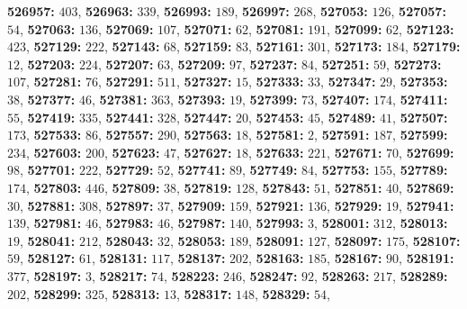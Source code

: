 \textsf{\bfseries 526957:} $403$, \textsf{\bfseries 526963:} $339$, \textsf{\bfseries 526993:} $189$, \textsf{\bfseries 526997:} $268$, \textsf{\bfseries 527053:} $126$, \textsf{\bfseries 527057:} $54$, \textsf{\bfseries 527063:} $136$, \textsf{\bfseries 527069:} $107$, \textsf{\bfseries 527071:} $62$, \textsf{\bfseries 527081:} $191$, \textsf{\bfseries 527099:} $62$, \textsf{\bfseries 527123:} $423$, \textsf{\bfseries 527129:} $222$, \textsf{\bfseries 527143:} $68$, \textsf{\bfseries 527159:} $83$, \textsf{\bfseries 527161:} $301$, \textsf{\bfseries 527173:} $184$, \textsf{\bfseries 527179:} $12$, \textsf{\bfseries 527203:} $224$, \textsf{\bfseries 527207:} $63$, \textsf{\bfseries 527209:} $97$, \textsf{\bfseries 527237:} $84$, \textsf{\bfseries 527251:} $59$, \textsf{\bfseries 527273:} $107$, \textsf{\bfseries 527281:} $76$, \textsf{\bfseries 527291:} $511$, \textsf{\bfseries 527327:} $15$, \textsf{\bfseries 527333:} $33$, \textsf{\bfseries 527347:} $29$, \textsf{\bfseries 527353:} $38$, \textsf{\bfseries 527377:} $46$, \textsf{\bfseries 527381:} $363$, \textsf{\bfseries 527393:} $19$, \textsf{\bfseries 527399:} $73$, \textsf{\bfseries 527407:} $174$, \textsf{\bfseries 527411:} $55$, \textsf{\bfseries 527419:} $335$, \textsf{\bfseries 527441:} $328$, \textsf{\bfseries 527447:} $20$, \textsf{\bfseries 527453:} $45$, \textsf{\bfseries 527489:} $41$, \textsf{\bfseries 527507:} $173$, \textsf{\bfseries 527533:} $86$, \textsf{\bfseries 527557:} $290$, \textsf{\bfseries 527563:} $18$, \textsf{\bfseries 527581:} $2$, \textsf{\bfseries 527591:} $187$, \textsf{\bfseries 527599:} $234$, \textsf{\bfseries 527603:} $200$, \textsf{\bfseries 527623:} $47$, \textsf{\bfseries 527627:} $18$, \textsf{\bfseries 527633:} $221$, \textsf{\bfseries 527671:} $70$, \textsf{\bfseries 527699:} $98$, \textsf{\bfseries 527701:} $222$, \textsf{\bfseries 527729:} $52$, \textsf{\bfseries 527741:} $89$, \textsf{\bfseries 527749:} $84$, \textsf{\bfseries 527753:} $155$, \textsf{\bfseries 527789:} $174$, \textsf{\bfseries 527803:} $446$, \textsf{\bfseries 527809:} $38$, \textsf{\bfseries 527819:} $128$, \textsf{\bfseries 527843:} $51$, \textsf{\bfseries 527851:} $40$, \textsf{\bfseries 527869:} $30$, \textsf{\bfseries 527881:} $308$, \textsf{\bfseries 527897:} $37$, \textsf{\bfseries 527909:} $159$, \textsf{\bfseries 527921:} $136$, \textsf{\bfseries 527929:} $19$, \textsf{\bfseries 527941:} $139$, \textsf{\bfseries 527981:} $46$, \textsf{\bfseries 527983:} $46$, \textsf{\bfseries 527987:} $140$, \textsf{\bfseries 527993:} $3$, \textsf{\bfseries 528001:} $312$, \textsf{\bfseries 528013:} $19$, \textsf{\bfseries 528041:} $212$, \textsf{\bfseries 528043:} $32$, \textsf{\bfseries 528053:} $189$, \textsf{\bfseries 528091:} $127$, \textsf{\bfseries 528097:} $175$, \textsf{\bfseries 528107:} $59$, \textsf{\bfseries 528127:} $61$, \textsf{\bfseries 528131:} $117$, \textsf{\bfseries 528137:} $202$, \textsf{\bfseries 528163:} $185$, \textsf{\bfseries 528167:} $90$, \textsf{\bfseries 528191:} $377$, \textsf{\bfseries 528197:} $3$, \textsf{\bfseries 528217:} $74$, \textsf{\bfseries 528223:} $246$, \textsf{\bfseries 528247:} $92$, \textsf{\bfseries 528263:} $217$, \textsf{\bfseries 528289:} $202$, \textsf{\bfseries 528299:} $325$, \textsf{\bfseries 528313:} $13$, \textsf{\bfseries 528317:} $148$, \textsf{\bfseries 528329:} $54$, 

